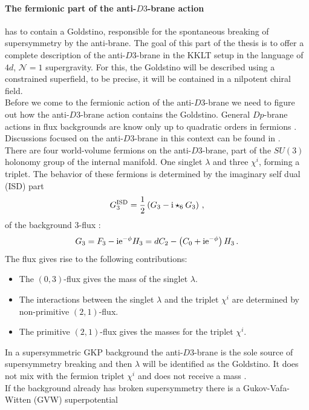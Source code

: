 \documentclass[12pt]{report}
\newcommand{\be}{\begin{equation}}
\newcommand{\ee}{\end{equation}}
\def\rmi{{\rm i}}
\def\rme{{\rm e}}
\begin{document}
\paragraph{The fermionic part of the anti-$D3$-brane action} has to contain a Goldstino, responsible for the spontaneous breaking of supersymmetry by the anti-brane. The goal of this part of the thesis is  to offer a complete description of the anti-$D3$-brane in the KKLT setup in the language of $4d$, $\mathcal{N}=1$ supergravity. For this, the Goldstino will be described using a constrained superfield, to be precise, it will be contained in a nilpotent chiral field. \\
Before we come to the fermionic action of the anti-$D3$-brane we need to figure out how the anti-$D3$-brane action contains the Goldstino. General $Dp$-brane actions in flux backgrounds are know only up to quadratic orders in fermions \cite{Grana:2002tu,Grana:2003ek,Marolf:2003ye,Tripathy:2005hv,Martucci:2005rb,Bergshoeff:2013pia}. Discussions focused on the anti-$D3$-brane in this context can be found in \cite{Kallosh:2014wsa,Bergshoeff:2015jxa,GarciadelMoral:2017vnz,McGuirk:2012sb}. \\
There are four world-volume fermions on the anti-$D3$-brane, part of the $SU(3)$ holonomy group of the internal manifold. One singlet $\lambda$ and three $\chi^i$, forming a triplet. The behavior of these fermions is determined by the imaginary  self dual (ISD) part 
\be 
G_3^{\text{ISD}} = \frac{1}{2} \left( G_3 - \rmi \star_6 G_3 \right)\,,
\ee
of the background 3-flux \cite{Bergshoeff:2015jxa,McGuirk:2012sb} :
\be 
G_3 = F_3 - \rmi \rme^{-\phi} H_3 = dC_2 - \left(C_0 + \rmi \rme^{-\phi} \right) H_3\,.
\ee
The flux gives rise to the following contributions:
\begin{itemize}
\item The $(0,3)$-flux gives the mass of the singlet $\lambda$.
\item The interactions between the singlet $\lambda$ and the triplet $\chi^i$ are determined by non-primitive $(2,1)$-flux.
\item The primitive $(2,1)$-flux gives the masses for the triplet $\chi^i$.
\end{itemize}
In a supersymmetric GKP background the anti-$D3$-brane is the sole source of supersymmetry breaking and then $\lambda$ will be identified as the Goldstino. It does not mix with the fermion triplet $\chi^i$ and does not receive a mass \cite{Bergshoeff:2015jxa}.\\
If the background already has broken supersymmetry there is a Gukov-Vafa-Witten (GVW) superpotential \cite{Gukov:1999ya} 
\end{document}
